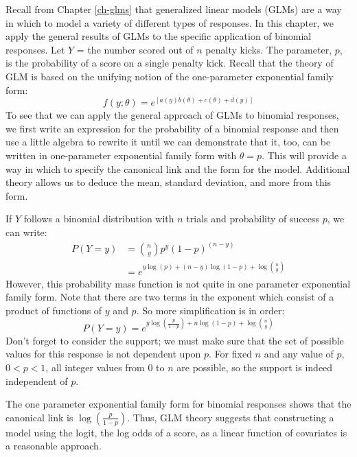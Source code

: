 \documentclass[
]{krantz}
\begin{document}
Recall from Chapter \ref{ch-glms} that generalized linear models (GLMs) are a way in which to model a variety of different types of responses. In this chapter, we apply the general results of GLMs to the specific application of binomial responses. Let \(Y\) = the number scored out of \(n\) penalty kicks. The parameter, \(p\), is the probability of a score on a single penalty kick. Recall that the theory of GLM is based on the unifying notion of the one-parameter exponential family form:
\begin{equation}
f(y;\theta)=e^{[a(y)b(\theta)+c(\theta)+d(y)]}
\label{eq:1expform}
\end{equation}
To see that we can apply the general approach of GLMs to binomial responses, we first write an expression for the probability of a binomial response and then use a little algebra to rewrite it until we can demonstrate that it, too, can be written in one-parameter exponential family form with \(\theta = p\). This will provide a way in which to specify the canonical link and the form for the model. Additional theory allows us to deduce the mean, standard deviation, and more from this form.

If \(Y\) follows a binomial distribution with \(n\) trials and probability of success \(p\), we can write:
\begin{align}
P(Y=y)&= \binom{n}{y}p^y(1-p)^{(n-y)} \\
      &=e^{y\log(p) + (n-y)\log(1-p) + \log\binom{n}{y}}
\label{eq:canlink}
\end{align}
However, this probability mass function is not quite in one parameter exponential family form. Note that there are two terms in the exponent which consist of a product of functions of \(y\) and \(p\). So more simplification is in order:
\begin{equation}
P(Y=y) = e^{y\log\left(\frac{p}{1-p}\right) + n\log(1-p)+ \log\binom{n}{y}}
\label{eq:opeff}
\end{equation}
Don't forget to consider the support; we must make sure that the set of possible values for this response is not dependent upon \(p\). For fixed \(n\) and any value of \(p\), \(0<p<1\), all integer values from \(0\) to \(n\) are possible, so the support is indeed independent of \(p\).

The one parameter exponential family form for binomial responses shows that the canonical link is \(\log\left(\frac{p}{1-p}\right)\). Thus, GLM theory suggests that constructing a model using the logit, the log odds of a score, as a linear function of covariates is a reasonable approach.
\end{document}
